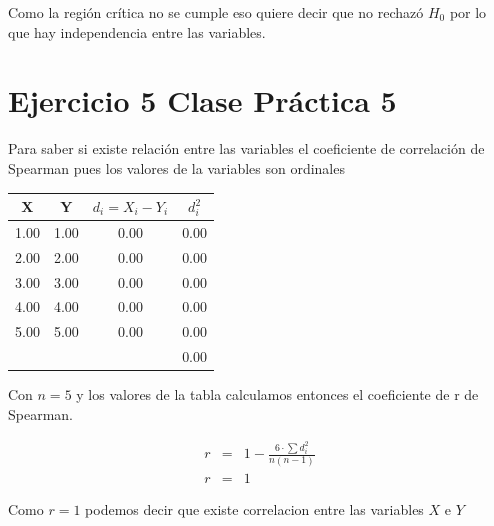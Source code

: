 \documentclass{article}
\begin{document}
		\begin{flushleft}
			Como la regi\'on cr\'itica no se cumple eso quiere decir que no rechaz\'o $H_{0}$ por lo que hay independencia entre las variables.
		\end{flushleft}
	
	
	
	\section*{Ejercicio 5 Clase Pr\'actica 5}
	
	\begin{flushleft}
		Para saber si existe relaci\'on entre las variables el coeficiente de correlaci\'on de Spearman pues los valores de la variables son ordinales
	\end{flushleft}
	
	\begin{table}[ht]
		\centering
		\begin{tabular}{|cccc|}
			\hline
			\rowcolor[gray]{0.9} X & Y & $d_{i}= X_i -Y_i$ & $d_{i}^{2}$ \\ 
			\hline
			1.00 & 1.00 & 0.00 & 0.00 \\ 
			2.00 & 2.00 & 0.00 & 0.00 \\ 
			3.00 & 3.00 & 0.00 & 0.00 \\ 
			4.00 & 4.00 & 0.00 & 0.00 \\ 
			5.00 & 5.00 & 0.00 & 0.00 \\ 
			\hline
	        &&& \cellcolor[gray]{0.9} 0.00  \\
			\hline
		\end{tabular}
	\end{table}
	
	\begin{flushleft}
		Con $n=5$ y los valores de la tabla calculamos entonces el coeficiente de r de Spearman.
	\end{flushleft}
	
	\begin{equation*}
		\begin{array}{rcl}
		r & = &\displaystyle 1- \frac{6 \cdot \sum d_{i}^{2}}{n\left(n-1\right)} \\
		r & = & 1 
		\end{array}
	\end{equation*}
	
	\begin{flushleft}
			Como $r=1$ podemos decir que existe correlacion entre las variables $X$ e $Y$
	\end{flushleft}
\end{document}
